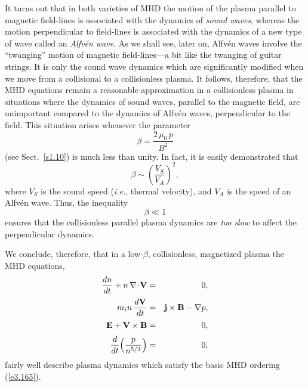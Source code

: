 It turns out that in both varieties of MHD the motion of the plasma
parallel to magnetic field-lines is associated with the dynamics of
{\em sound waves}, whereas the motion perpendicular to field-lines
is associated with the dynamics of a new type of wave called an {\em Alfv\'{e}n
wave}. As we shall see, later on,  Alfv\'{e}n
waves involve the ``twanging'' motion of magnetic field-lines---a bit
like the twanging of guitar strings. It is only the sound wave dynamics
which are significantly modified when we move from a collisional to a
collisionless plasma. It follows, therefore, that the MHD equations
remain a reasonable approximation in a collisionless plasma in situations where
the dynamics of sound waves,  parallel to the magnetic field, are unimportant
compared to the dynamics of Alfv\'{e}n waves, perpendicular to the field. 
This situation arises whenever the parameter
\begin{equation}
\beta = \frac{2\,\mu_0\,p}{B^2}
\end{equation}
(see Sect.~\ref{s1.10}) is much less than unity. In fact, it is easily
demonstrated that 
\begin{equation}
\beta \sim \left(\frac{V_S}{V_A}\right)^2,
\end{equation}
where $V_S$ is the sound speed ({\em i.e.}, thermal velocity), and $V_A$
is the speed of an Alfv\'{e}n wave. Thus, the inequality
\begin{equation}
\beta\ll 1
\end{equation}
ensures that the collisionless
parallel plasma dynamics are {\em  too slow}\/ to affect the
perpendicular dynamics. 

We conclude, therefore, that in a low-$\beta$, collisionless, magnetized
plasma the MHD equations,
\begin{eqnarray}
\frac{dn}{dt} + n\,\nabla\!\cdot\!{\bf V} &=& 0,\\[0.5ex]
m_i n\,\frac{d{\bf V}}{dt} &= & {\bf j}\times{\bf B} - \nabla p,\\[0.5ex]
{\bf E} + {\bf V} \times{\bf B} &=& 0,\\[0.5ex]
\frac{d}{dt}\!\left(\frac{p}{n^{5/3}}\right) &=& 0,
\end{eqnarray}
fairly well describe plasma dynamics which satisfy the basic MHD ordering
(\ref{e3.165}).

